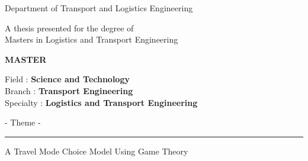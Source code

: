 \documentclass[12pt]{report}
\begin{document}
\begin{titlepage}

  
\begin{center}
	
		
	\vskip 5mm
	
		 {Department of Transport and Logistics Engineering} 
	
	\vskip 1cm
	
	
	 A thesis presented for the degree of\\
	 
       Masters in Logistics and Transport Engineering
	
		\vskip 4mm
		
	{\large {\bf MASTER}}
	

	
	\vskip 10mm
	
	Field : {\bf Science and Technology} \\
	Branch : {\bf Transport Engineering}\\
	Specialty : {\bf Logistics and Transport Engineering }
	\vskip 5mm
	
	
	
	\vskip 2mm
	
	\begin{center}

                       - Theme -
		\rule{\linewidth}{.5pt}
		{\Large\bf\strut A Travel Mode Choice Model Using Game Theory\\}
			

\end{center}
\end{center}
\end{titlepage}
\end{document}
